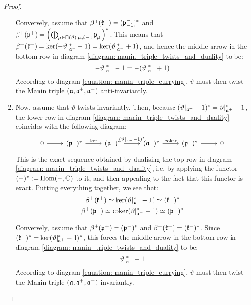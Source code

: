 \begin{proof}
\begin{enumerate}
                    Conversely, assume that $\beta^+(\mathfrak{k}^+) = (\mathfrak{p}^-_{-1})^*$ and $\beta^+(\mathfrak{p}^+) = \left( \bigoplus_{ \mu \in \mathsf{\Pi}(\vartheta), \mu \not = -1 } \mathfrak{p}_{\mu}^- \right)^*$. This means that $\beta^+(\mathfrak{k}^+) = \ker(-\vartheta|_{\mathfrak{a}^-}^* - 1) = \ker( \vartheta|_{\mathfrak{a}^-}^* + 1 )$, and hence the middle arrow in the bottom row in diagram \eqref{diagram: manin_triple_twists_and_duality} to be:
                        $$-\vartheta|_{\mathfrak{a}^-}^* - 1 = -( \vartheta|_{\mathfrak{a}^-}^* + 1 )$$
                    According to diagram \eqref{equation: manin_triple_currying}, $\vartheta$ must then twist the Manin triple $(\mathfrak{a}, \mathfrak{a}^+, \mathfrak{a}^-)$ anti-invariantly.
                    \item Now, assume that $\vartheta$ twists invariantly. Then, because $(\vartheta|_{\mathfrak{a}^+} - 1)^* = \vartheta|_{\mathfrak{a}^+}^* - 1$, the lower row in diagram \eqref{diagram: manin_triple_twists_and_duality} coincides with the following diagram:
                        \begin{equation}
                            \begin{tikzcd}
                            	0 & {(\p^-)^*} & {(\a^-)^*} & {(\a^-)^*} & {(\p^-)^*} & 0
                            	\arrow[from=1-1, to=1-2]
                            	\arrow["\ker", from=1-2, to=1-3]
                            	\arrow["{(\vartheta|_{\a^-} - 1)^*}", from=1-3, to=1-4]
                            	\arrow["\coker", from=1-4, to=1-5]
                            	\arrow[from=1-5, to=1-6]
                            \end{tikzcd}
                        \end{equation}
                    This is the exact sequence obtained by dualising the top row in diagram \eqref{diagram: manin_triple_twists_and_duality}, i.e. by applying the functor $(-)^* := \operatorname{Hom}(-, \mathbb{C})$ to it, and then appealing to the fact that this functor is exact. Putting everything together, we see that:
                        $$
                            \begin{gathered}
                                \beta^+(\mathfrak{k}^+) \simeq \ker(\vartheta|_{\mathfrak{a}^-}^* - 1) \simeq (\mathfrak{k}^-)^*
                                \\
                                \beta^+(\mathfrak{p}^+) \simeq \operatorname{coker}(\vartheta|_{\mathfrak{a}^-}^* - 1) \simeq (\mathfrak{p}^-)^*
                            \end{gathered}
                        $$
                        
                    Conversely, assume that $\beta^+(\mathfrak{p}^+) = (\mathfrak{p}^-)^*$ and $\beta^+(\mathfrak{k}^+) = (\mathfrak{k}^-)^*$. Since $(\mathfrak{k}^-)^* = \ker(\vartheta|_{\mathfrak{a}^+}^* - 1)^*$, this forces the middle arrow in the bottom row in diagram \eqref{diagram: manin_triple_twists_and_duality} to be:
                        $$\vartheta|_{\mathfrak{a}^-}^* - 1$$
                    According to diagram \eqref{equation: manin_triple_currying}, $\vartheta$ must then twist the Manin triple $(\mathfrak{a}, \mathfrak{a}^+, \mathfrak{a}^-)$ invariantly.
                \end{enumerate}
            \end{proof}

